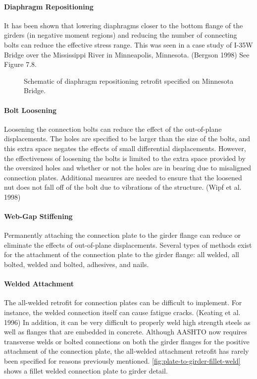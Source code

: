 \paragraph{Diaphragm Repositioning}
It has been shown that lowering diaphragms closer to the bottom flange of the girders (in negative moment
regions) and reducing the number of connecting bolts can reduce the effective stress range. This was seen in a case
study of I-35W Bridge over the Mississippi River in Minneapolis, Minnesota. (Bergson 1998) See Figure 7.8.

\begin{figure}
  \caption{Schematic of diaphragm repositioning retrofit specified on Minnesota Bridge.}
  \label{fig:diaphragm-reposition-retrofit}
\end{figure}

\paragraph{Bolt Loosening}
Loosening the connection bolts can reduce the effect of the out-of-plane displacements. The holes are specified
to be larger than the size of the bolts, and this extra space negates the effects of small differential displacements.
However, the effectiveness of loosening the bolts is limited to the extra space provided by the oversized holes and
whether or not the holes are in bearing due to misaligned connection plates. Additional measures are needed to
ensure that the loosened nut does not fall off of the bolt due to vibrations of the structure. (Wipf et al. 1998)

\paragraph{Web-Gap Stiffening}
Permanently attaching the connection plate to the girder flange can reduce or eliminate the effects of out-of-plane
displacements. Several types of methods exist for the attachment of the connection plate to the girder flange: all
welded, all bolted, welded and bolted, adhesives, and nails.

\paragraph{Welded Attachment}
The all-welded retrofit for connection plates can be difficult to implement. For instance, the welded connection
itself can cause fatigue cracks. (Keating et al. 1996) In addition, it can be very difficult to properly weld high
strength steels as well as flanges that are embedded in concrete. Although AASHTO now requires transverse welds
or bolted connections on both the girder flanges for the positive attachment of the connection plate, the all-welded
attachment retrofit has rarely been specified for reasons previously mentioned. \cite{aashto2012l} \cref{fig:plate-to-girder-fillet-weld} shows a
fillet welded connection plate to girder detail.

